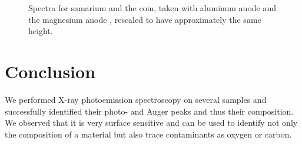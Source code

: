 \documentclass[a4paper,10pt]{scrartcl}
\begin{document}
\begin{figure}[h]
\centering
{}
\caption{Spectra for samarium and the coin, taken with aluminum anode  and the magnesium anode , rescaled to have approximately the same height. \label{fig:sm-coin}}
\end{figure}

\section{Conclusion}

We performed X-ray photoemission spectroscopy on several samples and successfully identified their photo- and Auger peaks and thus their composition. We observed that it is very surface sensitive and can be used to identify not only the composition of a material but also trace contaminants as oxygen or carbon.
\end{document}
